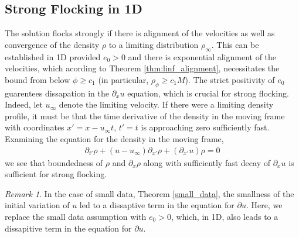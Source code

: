 \documentclass[11pt,letterpaper]{amsart}
\theoremstyle{plain}
\theoremstyle{definition}
\theoremstyle{remark}
\newtheorem{remark}[THEOREM]{Remark}
\renewcommand{\geq}{\geqslant}
\begin{document}
\subsection{Strong Flocking in 1D} 
\label{sec:strong_flocking}
The solution flocks strongly if there is alignment of the velocities as well as convergence of the density $\rho$ to a limiting distribution $\rho_{\infty}$. 
This can be established in 1D provided $e_0 > 0$ and there is exponential alignment of the velocities, which acording to Theorem \ref{thm:linf_alignment}, necessitates 
the bound from below $\phi \geq c_1$ (in particular, $\rho_{\phi} \geq c_1 M$). The strict positivity of $e_0$ guarentees 
dissapation in the $\partial_x u$ equation, which is crucial for strong flocking.  Indeed,
let $u_{\infty}$ denote the limiting velocity.  If there were a limiting density profile, it must be that the time derivative of the density 
in the moving frame with coordinates $x' = x - u_{\infty}t$, $t' = t$ is approaching zero sufficiently fast. 
Examining the equation for the density in the moving frame, 
\begin{align}
    \label{eq:rho_moving_frame}
    \partial_{t'} \rho + (u - u_{\infty}) \partial_{x'} \rho + (\partial_{x'} u) \rho = 0
\end{align}
we see that boundedness of $\rho$ and $\partial_x \rho$ along with sufficiently fast decay of $\partial_x u$ is 
sufficient for strong flocking.  
\begin{remark}
    In the case of small data, Theorem \ref{small_data}, the smallness of the initial variation of $u$ led 
    to a dissaptive term in the equation for $\partial u$.  Here, we replace the small data assumption with $e_0 > 0$, 
    which, in 1D, also leads to a dissapitive term in the equation for $\partial u$.
\end{remark}
\end{document}
